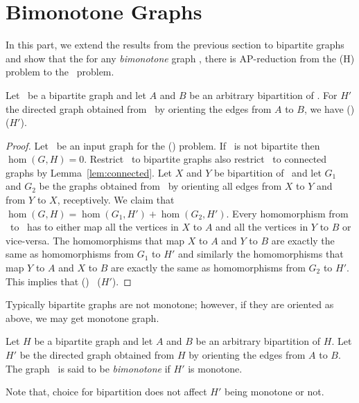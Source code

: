 \section{Bimonotone Graphs}
In this part, we extend the results from the previous section to bipartite
graphs and show that the for any \emph{bimonotone} graph \mH, there is AP-reduction from the \chom(H)
problem to the \cbis\ problem.

\begin{theorem}  \label{theorem:bior}
Let \mH\ be a bipartite graph and let \(A\) and \(B\) be an arbitrary
bipartition of \mH\@. For \(H'\) the directed graph obtained from
\mH\ by orienting the edges from \(A\) to \(B\), we have \chom(\mH) \maple \chom(\(H'\)).
\end{theorem}

\begin{proof}
Let \mG\ be an input graph for the \chom(\mH) problem. If \mG\ is not bipartite then 
\(\hom(G,H)=0\). Restrict \mG\ to bipartite graphs also restrict \mG\ to connected graphs
by Lemma~\ref{lem:connected}\@. Let \(X\) and \(Y\) be bipartition of \mG\ and let \(G_1\) 
and \(G_2\) be the graphs obtained from \mG\ by orienting all edges from \(X\) to \(Y\) and
from \(Y\) to \(X\), receptively. We claim that \(\hom(G,H) = \hom(G_1, H') + \hom(G_2, H')\).
Every homomorphism from \mG\ to \mH\ has to either map all the vertices in
\(X\) to \(A\) and all the vertices in \(Y\) to \(B\) or vice-versa. The homomorphisms that
map \(X\) to \(A\) and \(Y\) to \(B\) are exactly the same as homomorphisms from \(G_1\) to
\(H'\) and similarly the homomorphisms that map \(Y\) to \(A\) and \(X\) to \(B\)
are exactly the same as homomorphisms from \(G_2\) to \(H'\)\@. This implies that
\chom(\mH) \maple\ \chom(\(H'\))\@.
\end{proof}

Typically bipartite graphs are not monotone; however, if they are oriented as above,
we may get monotone graph.

\begin{defi} 
Let \(H\) be a bipartite graph and let \(A\) and \(B\) be an arbitrary
bipartition of \(H\). Let \(H'\) be the directed graph obtained from
\(H\) by orienting the edges from \(A\) to \(B\)\@. The graph \mH\ is said to be \emph{bimonotone}
if \(H'\) is monotone.
\end{defi}

Note that, choice for bipartition does not affect \(H'\) being monotone or not.

